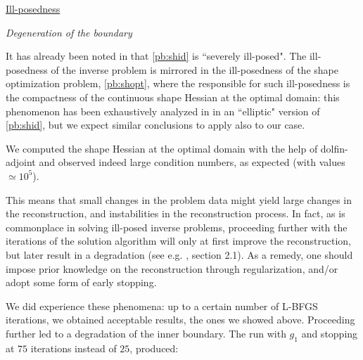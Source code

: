\documentclass[english,a4paper,9pt,oneside]{scrbook}	%
\theoremstyle{break}
\theoremstyle{remark}
\begin{document}
\underline{Ill-posedness}

\textit{Degeneration of the boundary}

It has already been noted in \cite{harbrecht} that \cref{pb:shid} is ``severely ill-posed". The ill-posedness of the inverse problem is mirrored in the ill-posedness of the shape optimization problem, \cref{pb:shopt}, where the responsible for such ill-posedness is the compactness of the continuous shape Hessian at the optimal domain: this phenomenon has been exhaustively analyzed in \cite{eppler} in an ``elliptic" version of \cref{pb:shid}, but we expect similar conclusions to apply also to our case.

We computed the shape Hessian at the optimal domain with the help of dolfin-adjoint and observed indeed large condition numbers, as expected (with values $\simeq 10^5$).

This means that small changes in the problem data might yield large changes in the reconstruction, and instabilities in the reconstruction process. In fact, as is commonplace in solving ill-posed inverse problems, proceeding further with the iterations of the solution algorithm will only at first improve the reconstruction, but later result in a degradation (see e.g. \cite{kirsch}, section 2.1). As a remedy, one should impose prior knowledge on the reconstruction through regularization, and/or adopt some form of early stopping.

We did experience these phenomena: up to a certain number of L-BFGS iterations, we obtained acceptable results, the ones we showed above. Proceeding further led to a degradation of the inner boundary. The run with $g_1$ and stopping at $75$ iterations instead of $25$, produced:
\end{document}

